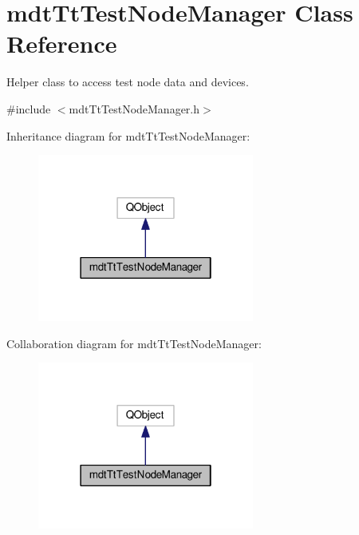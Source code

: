 \hypertarget{classmdt_tt_test_node_manager}{\section{mdt\-Tt\-Test\-Node\-Manager Class Reference}
\label{classmdt_tt_test_node_manager}
}


Helper class to access test node data and devices.  




{\ttfamily \#include $<$mdt\-Tt\-Test\-Node\-Manager.\-h$>$}



Inheritance diagram for mdt\-Tt\-Test\-Node\-Manager\-:
\nopagebreak
\begin{figure}[H]
\begin{center}
\leavevmode
\includegraphics[width=202pt]{classmdt_tt_test_node_manager__inherit__graph}
\end{center}
\end{figure}


Collaboration diagram for mdt\-Tt\-Test\-Node\-Manager\-:
\nopagebreak
\begin{figure}[H]
\begin{center}
\leavevmode
\includegraphics[width=202pt]{classmdt_tt_test_node_manager__coll__graph}
\end{center}
\end{figure}
